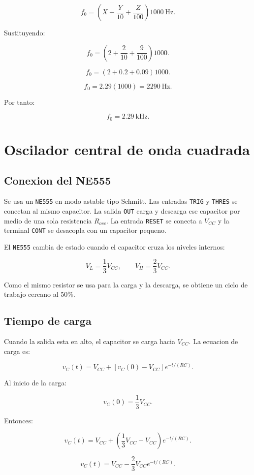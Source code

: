 \documentclass[11pt,letterpaper]{article}
\begin{document}
\[
f_0=
\left(
X+\frac{Y}{10}+\frac{Z}{100}
\right)1000~\text{Hz}.
\]

Sustituyendo:

\[
f_0=
\left(
2+\frac{2}{10}+\frac{9}{100}
\right)1000.
\]

\[
f_0=
\left(
2+0.2+0.09
\right)1000.
\]

\[
f_0=2.29(1000)=2290~\text{Hz}.
\]

Por tanto:

\[
\boxed{f_0=2.29~\text{kHz}}.
\]

\section{Oscilador central de onda cuadrada}

\subsection{Conexion del NE555}

Se usa un \texttt{NE555} en modo astable tipo Schmitt. Las entradas
\texttt{TRIG} y \texttt{THRES} se conectan al mismo capacitor. La salida
\texttt{OUT} carga y descarga ese capacitor por medio de una sola resistencia
\(R_{osc}\). La entrada \texttt{RESET} se conecta a \(V_{CC}\) y la terminal
\texttt{CONT} se desacopla con un capacitor pequeno.

El \texttt{NE555} cambia de estado cuando el capacitor cruza los niveles
internos:

\[
V_L=\frac{1}{3}V_{CC},
\qquad
V_H=\frac{2}{3}V_{CC}.
\]

Como el mismo resistor se usa para la carga y la descarga, se obtiene un ciclo
de trabajo cercano al \(50\%\).

\subsection{Tiempo de carga}

Cuando la salida esta en alto, el capacitor se carga hacia \(V_{CC}\). La
ecuacion de carga es:

\[
v_C(t)=V_{CC}+\left[v_C(0)-V_{CC}\right]e^{-t/(RC)}.
\]

Al inicio de la carga:

\[
v_C(0)=\frac{1}{3}V_{CC}.
\]

Entonces:

\[
v_C(t)=V_{CC}+
\left(\frac{1}{3}V_{CC}-V_{CC}\right)e^{-t/(RC)}.
\]

\[
v_C(t)=V_{CC}-\frac{2}{3}V_{CC}e^{-t/(RC)}.
\]
\end{document}

